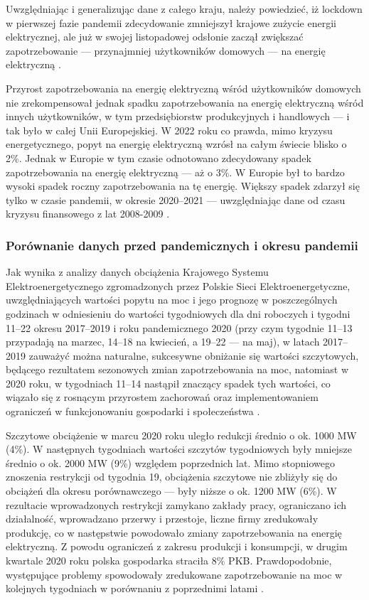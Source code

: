 \documentclass[polish, twoside, 12pt, a4paper]{article}
\theoremstyle{definition}
\theoremstyle{plain}
\theoremstyle{remark}
\begin{document}
Uwzględniając i generalizując dane z całego kraju, należy powiedzieć, iż lockdown w pierwszej fazie pandemii zdecydowanie zmniejszył krajowe zużycie energii elektrycznej, ale już w swojej listopadowej odsłonie zaczął zwiększać zapotrzebowanie --- przynajmniej użytkowników domowych --- na energię elektryczną \parencite{kazimierska2023}.

Przyrost zapotrzebowania na energię elektryczną wśród użytkowników domowych nie zrekompensował jednak spadku zapotrzebowania na energię elektryczną wśród innych użytkowników, w tym przedsiębiorstw produkcyjnych i handlowych --- i tak było w całej Unii Europejskiej. W 2022 roku co prawda, mimo kryzysu energetycznego, popyt na energię elektryczną wzrósł na całym świecie blisko o 2\%. Jednak w Europie w tym czasie odnotowano zdecydowany spadek zapotrzebowania na energię elektryczną --- aż o 3\%. W Europie był to bardzo wysoki spadek roczny zapotrzebowania na tę energię. Większy spadek zdarzył się tylko w czasie pandemii, w okresie 2020--2021 --- uwzględniając dane od czasu kryzysu finansowego z lat 2008-2009 \parencite{maciuch2023}.  

\subsubsection{Porównanie danych przed pandemicznych i okresu pandemii}

Jak wynika z analizy danych obciążenia Krajowego Systemu Elektroenergetycznego zgromadzonych przez Polskie Sieci Elektroenergetyczne, uwzględniających wartości popytu na moc i jego prognozę w poszczególnych godzinach w odniesieniu do wartości tygodniowych dla dni roboczych i tygodni 11--22 okresu 2017--2019 i roku pandemicznego 2020 (przy czym tygodnie 11--13 przypadają na marzec, 14--18 na kwiecień, a 19--22 --- na maj), w latach 2017--2019 zauważyć można naturalne, sukcesywne obniżanie się wartości szczytowych, będącego rezultatem sezonowych zmian zapotrzebowania na moc, natomiast w 2020 roku, w tygodniach 11--14 nastąpił znaczący spadek tych wartości, co wiązało się z rosnącym przyrostem zachorowań oraz implementowaniem ograniczeń w funkcjonowaniu gospodarki i społeczeństwa \parencite{stahl2021}. 

Szczytowe obciążenie w marcu 2020 roku uległo redukcji średnio o ok. 1000 MW (4\%). W następnych tygodniach wartości szczytów tygodniowych były mniejsze średnio o ok. 2000 MW (9\%) względem poprzednich lat. Mimo stopniowego znoszenia restrykcji od tygodnia 19, obciążenia szczytowe nie zbliżyły się do obciążeń dla okresu porównawczego --- były niższe o ok. 1200 MW (6\%). W rezultacie wprowadzonych restrykcji zamykano zakłady pracy, ograniczano ich działalność, wprowadzano przerwy i przestoje, liczne firmy zredukowały produkcję, co w następstwie powodowało zmiany zapotrzebowania na energię elektryczną. Z powodu ograniczeń z zakresu produkcji i konsumpcji, w drugim kwartale 2020 roku polska gospodarka straciła 8\% PKB. Prawdopodobnie, występujące problemy spowodowały zredukowane zapotrzebowanie na moc w kolejnych tygodniach w porównaniu z poprzednimi latami \parencite{stahl2021}. 
\end{document}
